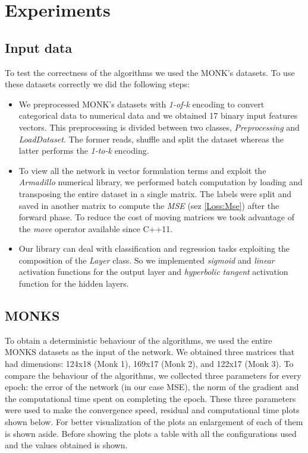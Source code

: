 \section{Experiments}

\subsection{Input data}
To test the correctness of the algorithms we used the MONK's datasets. To use these datasets correctly we did the following steps:
\begin{itemize}
	\item We preprocessed MONK's datasets with \textit{1-of-k} encoding to convert categorical data to numerical data and we obtained 17 binary input features vectors. This preprocessing is divided between two classes, \textit{Preprocessing} and \textit{LoadDataset}. The former reads, shuffle and split the dataset whereas the latter performs the \textit{1-to-k} encoding. 
	\item To view all the network in vector formulation terms and exploit the \textit{Armadillo} numerical library, we performed batch computation by loading and transposing the entire dataset in a single matrix. The labels were split and saved in another matrix to compute the \textit{MSE} (sez \ref{Loss:Mse}) after the forward phase. To reduce the cost of moving matrices we took advantage of the \textit{move} operator available since C++11. 
	\item Our library can deal with classification and regression tasks exploiting the composition of the \textit{Layer} class.  So we implemented \textit{sigmoid} and \textit{linear} activation functions for the output layer and \textit{hyperbolic tangent} activation function for the hidden layers.
\end{itemize}


\subsection{MONKS} 
To obtain a deterministic behaviour of the algorithms, we used the entire MONKS datasets as the input of the network. We obtained three matrices that had dimensions: 124x18 (Monk 1), 169x17 (Monk 2), and 122x17 (Monk 3). To compare the behaviour of the algorithms, we collected three parameters for every epoch: the error of the network (in our case MSE), the norm of the gradient and the computational time spent on completing the epoch. These three parameters were used to make the convergence speed, residual and computational time plots shown below. For better visualization of the plots an enlargement of each of them is shown aside. Before showing the plots a table with all the configurations used and the values obtained is shown.

